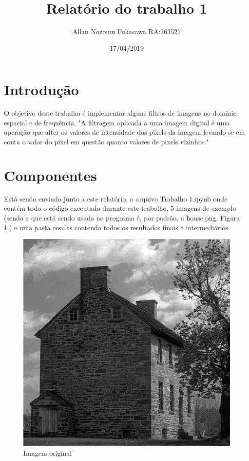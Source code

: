 \documentclass{article}
\title{Relatório do trabalho 1}
\date{17/04/2019}
\author{Allan Nozomu Fukasawa RA:163527}
\begin{document}
\twocolumn
\maketitle

\section{Introdução}

O objetivo deste trabalho é implementar alguns filtros de imagens no domínio espacial e de frequência. "A filtragem aplicada a uma imagem digital é uma operação que alter os valores de intensidade dos pixels da imagem levando-se em conta o valor do pixel em questão quanto valores de pixels vizinhos." \cite{Helio:1}

\section{Componentes}

Está sendo enviado junto a este relatório, o arquivo Trabalho 1.ipynb onde contém todo o código executado durante este trabalho, 5 imagens de exemplo (sendo a que está sendo usada no programa é, por padrão, a house.png, Figura \ref{fig:original}.) e uma pasta results contendo todos os resultados finais e intermediários.

\begin{figure}[h!]
    \includegraphics[width=\linewidth]{house.png}
    \caption{Imagem original}
    \label{fig:original}
\end{figure}
\end{document}
